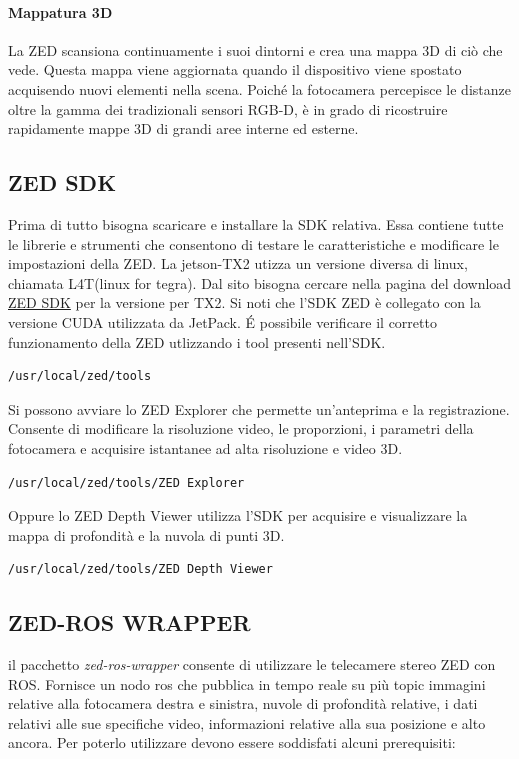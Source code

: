\documentclass[a4paper]{article}
\begin{document}
\paragraph{Mappatura 3D}
La ZED scansiona continuamente i suoi dintorni e crea una mappa 3D di ciò che vede. Questa mappa viene aggiornata quando il dispositivo viene spostato acquisendo nuovi elementi nella scena. Poiché la fotocamera percepisce le distanze oltre la gamma dei tradizionali sensori RGB-D, è in grado di ricostruire rapidamente mappe 3D di grandi aree interne ed esterne.

\subsection{ZED SDK}
Prima di tutto bisogna scaricare e installare la SDK relativa. Essa contiene tutte le librerie e strumenti che  consentono di testare le caratteristiche e modificare le impostazioni della ZED.
La jetson-TX2 utizza un versione diversa di linux, chiamata L4T(linux for tegra). Dal sito bisogna cercare nella pagina del download 
 \href{https://www.stereolabs.com/developers/release/#sdkdownloads_anchor}{ZED SDK} per la versione per TX2. 
Si noti che l'SDK ZED è collegato con la versione CUDA utilizzata da JetPack.
\'E possibile verificare il corretto funzionamento della ZED utlizzando i tool presenti nell'SDK.
\begin{verbatim}
/usr/local/zed/tools
\end{verbatim}
Si possono avviare lo ZED Explorer che permette un'anteprima e la registrazione. Consente di modificare la risoluzione video, le proporzioni, i parametri della fotocamera e acquisire istantanee ad alta risoluzione e video 3D.
\begin{verbatim}
/usr/local/zed/tools/ZED Explorer
\end{verbatim}
Oppure lo ZED Depth Viewer utilizza l'SDK per acquisire e visualizzare la mappa di profondità e la nuvola di punti 3D.
\begin{verbatim}
/usr/local/zed/tools/ZED Depth Viewer
\end{verbatim}
\newpage
\subsection{ZED-ROS WRAPPER}

il pacchetto \textit{zed-ros-wrapper} consente di utilizzare le telecamere stereo ZED con ROS. 
Fornisce un nodo ros che pubblica in tempo reale su più topic immagini relative alla fotocamera destra e sinistra, nuvole di profondità relative, i dati relativi alle sue specifiche video, informazioni relative alla sua posizione e alto ancora.
Per poterlo utilizzare devono essere soddisfati alcuni prerequisiti:
\end{document}

